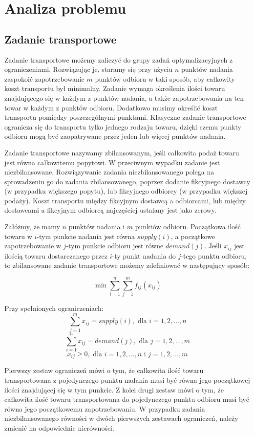 \chapter{Analiza problemu}
\thispagestyle{chapterBeginStyle}
\label{rozdzial1}

\section{Zadanie transportowe}
Zadanie transportowe możemy zaliczyć do grupy zadań optymalizacyjnych z ograniczeniami. Rozwiązując je, staramy się przy użyciu $n$ punktów nadania 
zaspokoić zapotrzebowanie $m$ punktów odbioru w taki sposób, aby całkowity koszt transportu był minimalny. Zadanie wymaga określenia ilości 
towaru znajdującego się w każdym z punktów nadania, a także zapotrzebowania na ten towar w każdym z punktów odbioru. Dodatkowo musimy określić 
koszt transportu pomiędzy poszczególnymi punktami. Klasyczne zadanie transportowe ogranicza się do transportu 
tylko jednego rodzaju towaru, dzięki czemu punkty odbioru mogą być zaopatrywane przez jeden lub więcej punktów nadania.

Zadanie transportowe nazywamy zbilansowanym, jeśli całkowita podaż towaru jest równa całkowitemu popytowi. W przeciwnym wypadku 
zadanie jest niezbilansowane. Rozwiązywanie zadania niezbilansowanego polega na sprowadzeniu go do zadania zbilansowanego, poprzez 
dodanie fikcyjnego dostawcy (w przypadku większego popytu), lub fikcyjnego odbiorcy (w przypadku większej podaży). Koszt transportu 
między fikcyjnym dostawcą a odbiorcami, lub między dostawcami a fikcyjnym odbiorcą najczęściej ustalany jest jako zerowy.

Załóżmy, że mamy $n$ punktów nadania i $m$ punktów odbioru. Początkowa ilość towaru w $i$-tym punkcie nadania jest równa $supply(i)$, 
a początkowe zapotrzebowanie w $j$-tym punkcie odbioru jest równe $demand(j)$. Jeśli $x_{ij}$ jest ilością towaru dostarczanego przez 
$i$-ty punkt nadania do $j$-tego punktu odbioru, to zbilansowane zadanie transportowe możemy zdefiniować w następujący sposób:

$$\min \sum_{i=1}^{n} \sum_{j=1}^{m} f_{ij}(x_{ij})$$

Przy spełnionych ograniczeniach:
$$\sum_{j=1}^{m} x_{ij} = supply(i), \text{ dla } i = 1, 2, \dots, n$$
$$\sum_{i=1}^{n} x_{ij} = demand(j), \text{ dla } j = 1, 2, \dots, m$$
$$x_{ij} \ge 0, \text{ dla } i = 1, 2, \dots, n \text{ i } j = 1, 2, \dots, m$$

Pierwszy zestaw ograniczeń mówi o tym, że całkowita ilość towaru transportowana z pojedynczego punktu nadania musi być równa jego początkowej 
ilości znajdującej się w tym punkcie. Z kolei drugi zestaw mówi o tym, że całkowita ilość towaru transportowana do pojedynczego punktu odbioru 
musi być równa jego początkowemu zapotrzebowaniu. W przypadku zadania niezbilansowanego równości w dwóch pierwszych zestawach ograniczeń, należy 
zmienić na odpowiednie nierówności. 

